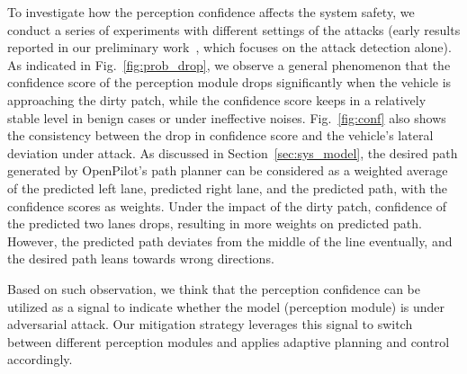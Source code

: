 To investigate how the perception confidence affects the system safety, we conduct a series of experiments with different settings of the attacks (early results reported in our preliminary work~\cite{liang2021endtoend}, which focuses on the attack detection alone). As indicated in Fig.~\ref{fig:prob_drop}, we observe a general phenomenon that the confidence score of the perception module drops significantly when the vehicle is approaching the dirty patch, while the confidence score keeps in a relatively stable level in benign cases or under ineffective noises. Fig.~\ref{fig:conf} also shows the consistency between the drop in confidence score and the vehicle's lateral deviation under attack. As discussed in Section~\ref{sec:sys_model}, the desired path generated by OpenPilot's path planner can be considered as a weighted average of the predicted left lane, predicted right lane, and the predicted path, with the confidence scores as weights. Under the impact of the dirty patch, confidence of the predicted two lanes drops, resulting in more weights on predicted path. However, the predicted path deviates from the middle of the line eventually, and the desired path leans towards wrong directions. 


    Based on such observation, we think that the perception confidence can be utilized as a signal to indicate whether the model (perception module) is under adversarial attack. Our mitigation strategy leverages this signal to switch between different perception modules and applies adaptive planning and control accordingly. 
    



